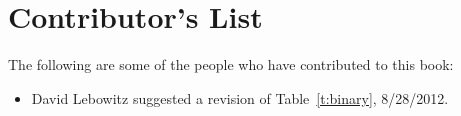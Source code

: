 \vspace{0.5in}
\section*{Contributor's List}
The following are some of the people who have contributed to this book:
\begin{itemize}
\item David Lebowitz suggested a revision of Table~\ref{t:binary}, 8/28/2012.
\end{itemize}
